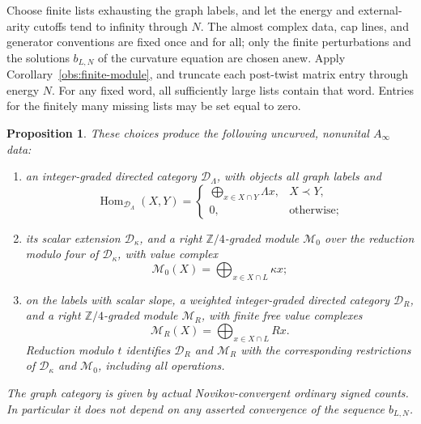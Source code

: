 \documentclass[11pt]{article}
\newtheorem{proposition}[theorem]{Proposition}
\theoremstyle{definition}
\theoremstyle{remark}
\numberwithin{equation}{section}
\begin{document}
Choose finite lists exhausting the graph labels, and let the energy and
external-arity cutoffs tend to infinity through \(N\).
The almost complex data, cap lines, and generator conventions are fixed
once and for all; only the finite perturbations and the solutions
\(b_{L,N}\) of the curvature equation are chosen anew.
Apply Corollary~\ref{obs:finite-module}, and truncate each post-twist
matrix entry through energy \(N\).  For any fixed word, all sufficiently
large lists contain that word.  Entries for the finitely many missing
lists may be set equal to zero.

\begin{proposition}\label{cat:module}
These choices produce the following uncurved, nonunital
\(A_\infty\) data:
\begin{enumerate}[label=\textup{(\roman*)}]
 \item an integer-graded directed category \(\mathcal D_\Lambda\), with
 objects all graph labels and
 \[
 \operatorname{Hom}_{\mathcal D_\Lambda}(X,Y)=
 \begin{cases}
   \displaystyle\bigoplus_{x\in X\cap Y}\Lambda x,&X\prec Y,\\
   0,&\text{otherwise};
 \end{cases}
 \]
 \item its scalar extension \(\mathcal D_\kappa\), and a right
 \(\mathbb Z/4\)-graded module \(\mathcal M_0\) over the reduction modulo four
 of \(\mathcal D_\kappa\), with value complex
 \[
 \mathcal M_0(X)=\bigoplus_{x\in X\cap L}\kappa x;
 \]
 \item on the labels with scalar slope, a weighted integer-graded
 directed category \(\mathcal D_R\), and a right \(\mathbb Z/4\)-graded module
 \(\mathcal M_R\), with finite free value complexes
 \[
 \mathcal M_R(X)=\bigoplus_{x\in X\cap L}R x.
 \]
 Reduction modulo \(t\) identifies \(\mathcal D_R\) and \(\mathcal M_R\)
 with the corresponding restrictions of \(\mathcal D_\kappa\) and
 \(\mathcal M_0\), including all operations.
\end{enumerate}
The graph category is given by actual Novikov-convergent ordinary signed
counts.  In particular it does not depend on any asserted convergence
of the sequence \(b_{L,N}\).
\end{proposition}
\end{document}
